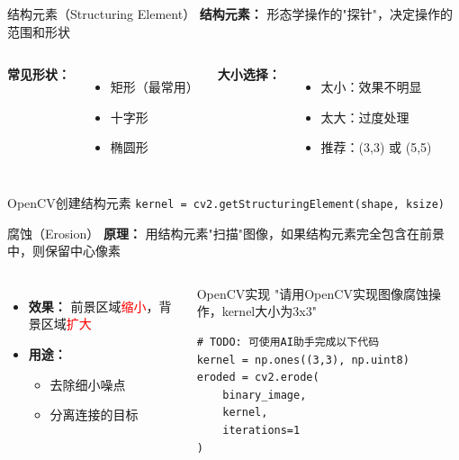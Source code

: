 \begin{frame}{结构元素（Structuring Element）}
    \textbf{结构元素：} 形态学操作的"探针"，决定操作的范围和形状

    \vspace{0.3cm}

    \begin{columns}
        \textbf{常见形状：}
        \begin{itemize}
            \item 矩形（最常用）
            \item 十字形
            \item 椭圆形
        \end{itemize}

        \textbf{大小选择：}
        \begin{itemize}
            \item 太小：效果不明显
            \item 太大：过度处理
            \item 推荐：(3,3) 或 (5,5)
        \end{itemize}
    \end{columns}

    \vspace{0.3cm}

    \begin{block}{OpenCV创建结构元素}
    \texttt{kernel = cv2.getStructuringElement(shape, ksize)}
    \end{block}
\end{frame}

\begin{frame}{腐蚀（Erosion）}
    \textbf{原理：} 用结构元素"扫描"图像，如果结构元素完全包含在前景中，则保留中心像素

    \vspace{0.3cm}

    \begin{columns}
        \begin{itemize}
            \item \textbf{效果：} 前景区域\textcolor{red}{缩小}，背景区域\textcolor{red}{扩大}
            \item \textbf{用途：}
                \begin{itemize}
                    \item 去除细小噪点
                    \item 分离连接的目标
                \end{itemize}
        \end{itemize}

        \begin{block}{OpenCV实现}
        \aihint{} "请用OpenCV实现图像腐蚀操作，kernel大小为3x3"
        \begin{lstlisting}
# TODO: 可使用AI助手完成以下代码
kernel = np.ones((3,3), np.uint8)
eroded = cv2.erode(
    binary_image,
    kernel,
    iterations=1
)
        \end{lstlisting}
        \end{block}
    \end{columns}
\end{frame}

